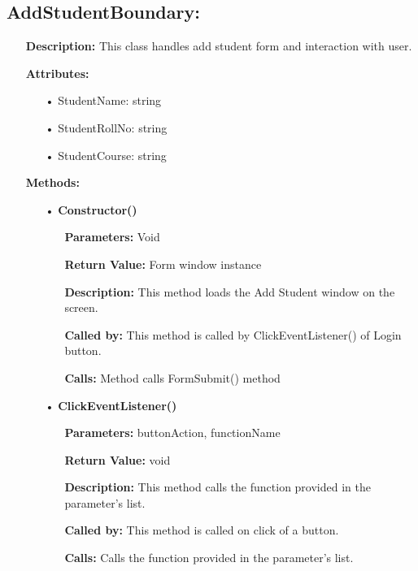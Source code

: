 \documentclass{scrreprt}
\begin{document}
\subsection{AddStudentBoundary: }
\begin{enumerate}
\item[] \textbf{Description:} This class handles add student form and interaction with user.
\item[] \textbf{Attributes:}
\begin{itemize}
\item [•] StudentName: string
\item [•] StudentRollNo: string
\item [•] StudentCourse: string
\end{itemize}
\item[]\textbf{Methods:}
\begin{itemize}
\item [•] \textbf{Constructor()}
\begin{itemize}
\item [] \textbf{Parameters:} Void 
\item [] \textbf{Return Value:} Form window instance
\item [] \textbf{Description:} This method loads the Add Student window on the screen.
\item [] \textbf{Called by:} This method is called by ClickEventListener() of Login button.
\item [] \textbf{Calls:} Method calls FormSubmit() method
\end{itemize}

\item [•] \textbf{ClickEventListener()}
\begin{itemize}
\item [] \textbf{Parameters:} buttonAction, functionName 
\item [] \textbf{Return Value:} void
\item [] \textbf{Description:} This method calls the function provided in the parameter's list.
\item [] \textbf{Called by:} This method is called on click of a button.
\item [] \textbf{Calls:} Calls the function provided in the parameter's list.  
\end{itemize}


\end{itemize}
\end{enumerate}
\end{document}
